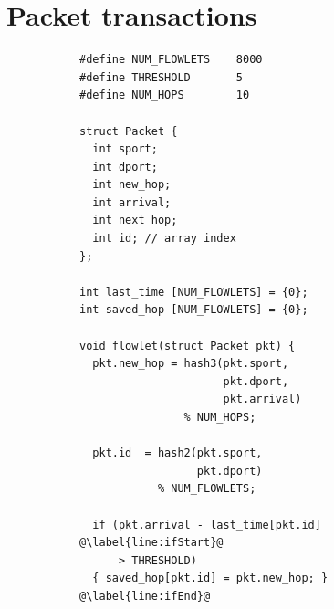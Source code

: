 \section{Packet transactions}
\label{s:transactions}

% 

\begin{figure}[!t]
\begin{subfigure}{0.5\textwidth}
\begin{small}
\begin{lstlisting}[style=customc]
#define NUM_FLOWLETS    8000
#define THRESHOLD       5
#define NUM_HOPS        10

struct Packet {
  int sport;
  int dport;
  int new_hop;
  int arrival;
  int next_hop;
  int id; // array index
};

int last_time [NUM_FLOWLETS] = {0};
int saved_hop [NUM_FLOWLETS] = {0};

void flowlet(struct Packet pkt) {
  pkt.new_hop = hash3(pkt.sport,
                      pkt.dport,
                      pkt.arrival)
                % NUM_HOPS;

  pkt.id  = hash2(pkt.sport,
                  pkt.dport)
            % NUM_FLOWLETS;

  if (pkt.arrival - last_time[pkt.id] @\label{line:ifStart}@
      > THRESHOLD)
  { saved_hop[pkt.id] = pkt.new_hop; } @\label{line:ifEnd}@


\end{lstlisting}
\end{small}
\end{subfigure}
\end{figure}
